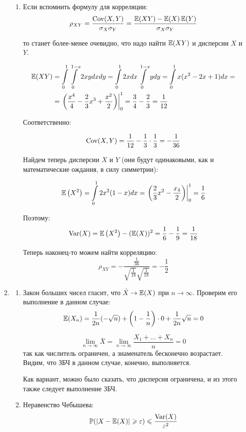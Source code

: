 \begin{enumerate}
\begin{enumerate}
\item Если вспомнить формулу для корреляции:
\[
\rho_{XY} = \frac{\operatorname{Cov}(X, Y)}{\sigma_X\sigma_Y}  = \frac{\operatorname{\mathbb{E}}(XY) - \operatorname{\mathbb{E}}(X)\operatorname{\mathbb{E}}(Y)}{\sigma_X\sigma_Y}
\]

то станет более-менее очевидно, что надо найти $\operatorname{\mathbb{E}}(XY)$ и дисперсии $X$ и $Y$.

\begin{align*}
\operatorname{\mathbb{E}}(XY) &= \int \limits_{0}^{1} \int \limits_{0}^{1-x} 2xy dxdy = \int \limits_{0}^{1} 2xdx \int \limits_{0}^{1-x}ydy =  \int \limits_{0}^{1}x(x^2-2x+1)dx = \\
&= \left. \left(\frac{x^4}{4} - \frac{2}{3}x^3 + \frac{x^2}{2}\right) \right|^{1}_{0} = \frac{3}{4}-\frac{2}{3} = \frac{1}{12}
\end{align*}

Соответственно:

\[
\operatorname{Cov}(X, Y) = \frac{1}{12} - \frac{1}{3}\cdot \frac{1}{3} = -\frac{1}{36}
\]

Найдем теперь дисперсии $X$ и $Y$ (они будут одинаковыми, как и математические ождания, в силу симметрии):

\[
\operatorname{\mathbb{E}}\left(X^2\right) = \int \limits_{0}^{1} 2x^2(1-x)dx = \left. \left( \frac{2}{3}x^2 - \frac{x_4}{2} \right) \right|_{0}^{1} = \frac{1}{6}
\]

Поэтому:
\[
\operatorname{Var}(X) = \operatorname{\mathbb{E}}\left(X^2\right) - (\operatorname{\mathbb{E}}(X))^2 = \frac{1}{6} - \frac{1}{9} = \frac{1}{18}
\]

Теперь наконец-то можем найти корреляцию:
\[
\rho_{XY} = -\frac{\frac{1}{36}}{\sqrt{\frac{1}{18}}\sqrt{\frac{1}{18}}} = -\frac{1}{2}
\]
\end{enumerate}

\item

\begin{enumerate}

\item Закон больших чисел гласит, что $\bar{X} \rightarrow
\operatorname{\mathbb{E}}(X)$ при $n\rightarrow \infty$. Проверим его выполнение в данном случае:
\[
\operatorname{\mathbb{E}}(X_n) = \frac{1}{2n}(-\sqrt{n}) + \left(1-\frac{1}{n}\right)\cdot0 + \frac{1}{2n}\sqrt{n} = 0
\]

\[
\lim\limits_{n\rightarrow\infty} \bar{X} = \lim\limits_{n\rightarrow\infty} \frac{X_1 +\dots + X_n}{n} = 0
\]
так как числитель ограничен, а знаменатель бесконечно возрастает.
Видим, что ЗБЧ в данном случае, конечно, выполняется.

Как вариант, можно было сказать, что дисперсия ограничена, и из этого также следует выполнение ЗБЧ.
\item Неравенство Чебышева:
\[
\operatorname{\mathbb{P}}(|X-\operatorname{\mathbb{E}}(X)|\geqslant \varepsilon) \leqslant \frac{\operatorname{Var}(X)}{\varepsilon^2}
\]


\end{enumerate}
\end{enumerate}
